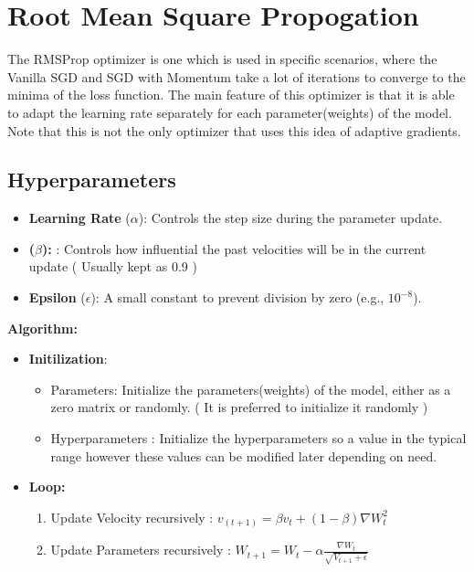 \documentclass{article}
\begin{document}
\newpage


\section*{Root Mean Square Propogation}
The RMSProp optimizer is one which is used in specific scenarios, where the Vanilla SGD and SGD with Momentum take a lot of iterations to converge to the minima of the loss function. The main feature of this optimizer is that it is able to adapt the learning rate separately for each parameter(weights) of the model. Note that this is not the only optimizer that uses this idea of adaptive gradients.

\subsection*{Hyperparameters}
\begin{itemize}
    \item \textbf{Learning Rate} ($\alpha$): Controls the step size during the parameter update.
    \item \textbf{($\beta$):} : Controls how influential the past velocities will be in the current update ( Usually kept as 0.9 )
    \item \textbf{Epsilon} ($\epsilon$): A small constant to prevent division by zero (e.g., $10^{-8}$).
\end{itemize}

\textbf{Algorithm: }
\begin{itemize}
    \item \textbf{Initilization}:
    \begin{itemize}
        \item Parameters: Initialize the parameters(weights) of the model, either as a zero matrix or randomly. ( It is preferred to initialize it randomly )
        \item Hyperparameters : Initialize the hyperparameters so a value in the typical range however these values can be modified later depending on need.    
    \end{itemize}
    \item \textbf{Loop:}
    \begin{enumerate}
        \item Update Velocity recursively : 
        $v_(t+1) = \beta v_{t} + (1 - \beta )\nabla W_t^2$
        \item Update Parameters recursively :
        $W_{t+1} = W_{t} - \alpha \frac{\nabla W_t}{\sqrt{V_{t+1} + \epsilon}}$
    \end{enumerate}
\end{itemize}
\end{document}
